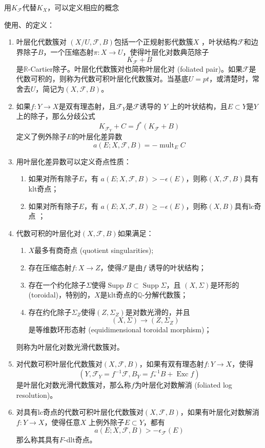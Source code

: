 用$K_{\mathcal{F}}$代替$K_{X}$，可以定义相应的概念
\begin{definition}
使用\cite[3.4.5,6.2.1]{chlx}、\cite[3.2]{acss}的定义：
  \begin{enumerate}
    \item 叶层化代数簇对 $(X/U,\mathcal{F},B)$包括一个正规射影代数簇$X$ ，叶状结构$\mathcal{F}$和边界除子$B$，一个压缩态射$\pi:X\to U$，使得叶层化对数典范除子
  \[ K_{\mathcal{F}}+B \]
  是$\mathbb{R}$-Cartier除子。叶层化代数簇对也简称叶层化对 (foliated pair)。如果$\mathcal{F}$是代数可积的，则称为代数可积叶层化代数簇对。当基底$U=pt$，或清楚时，常舍去$U$，简记为$(X,\mathcal{F},B)$。 
    \item 如果$f:Y\to X$是双有理态射，且$\mathcal{F}_{Y} $是$\mathcal{F} $诱导的 $Y$ 上的叶状结构，且$E \subset Y$是$Y$ 上的除子，那么分歧公式
  \[ K_{\mathcal{F}_{Y}}+C=f^{*}(K_{\mathcal{F}}+B) \]
  定义了例外除子$E$的叶层化差异数
  \[ a(E;X,\mathcal{F},B)=- \operatorname{mult}_{E}C \]
    \item 用叶层化差异数可以定义奇点性质：
      \begin{enumerate}
        \item 如果对所有除子$E$，有 $a(E;X,\mathcal{F},B)>-\epsilon(E)$，则称$(X,\mathcal{F},B) $具有klt奇点；
        \item 如果对所有除子$E$，有 $a(E;X,\mathcal{F},B)\geqslant -\epsilon(E)$，则称$(X,B) $具有lc奇点 ；
      \end{enumerate}
    \item 代数可积的叶层化对$(X,\mathcal{F},B)$如果满足：
      \begin{enumerate}
        \item $X$最多有商奇点 (quotient singularities);
        \item 存在压缩态射$f:X\to Z$，使得$\mathcal{F}$是由$f$ 诱导的叶状结构； 
        \item 存在一个约化除子$\Sigma$使得$\operatorname{Supp}B \subset \operatorname{Supp} \Sigma $，且 $(X,\Sigma)$是环形的 (toroidal)，特别的，$X$是klt奇点的$\mathbb{Q}$-分解代数簇；
        \item 存在约化除子$\Sigma_{Z}$使得$ (Z,\Sigma_{Z})$是对数光滑的，并且
          \[ (X,\Sigma)\to (Z,\Sigma_{Z}) \]
          是等维数环形态射 (equidimensional toroidal morphism)；
      \end{enumerate}
      则称为叶层化对数光滑代数簇对。
    \item 对代数可积叶层化代数簇对$(X,\mathcal{F},B)$，如果有双有理态射$f:Y\to X$，使得
      \[ (Y,\mathcal{F}_{Y}=f^{-1}\mathcal{F},B_{Y}=f^{-1}_{*}B+ \operatorname{Exc}f) \]
      是叶层化对数光滑代数簇对，那么称$f$为叶层化对数解消 (foliated log resolution)。
    \item 对具有lc奇点的代数可积叶层化代数簇对$(X,\mathcal{F},B)$，如果有叶层化对数解消$f:Y\to X$，使得任意$X$ 上例外除子$E \subset Y$，都有
      \[ a(E;X,\mathcal{F},B)>-\epsilon_{\mathcal{F}}(E) \]
      那么称其具有$F$-dlt奇点。
  \end{enumerate}
\end{definition}
